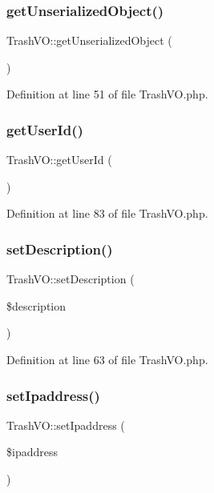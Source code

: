 \subsubsection{\texorpdfstring{get\+Unserialized\+Object()}{getUnserializedObject()}}
{\footnotesize\ttfamily Trash\+V\+O\+::get\+Unserialized\+Object (\begin{DoxyParamCaption}{ }\end{DoxyParamCaption})}



Definition at line 51 of file Trash\+V\+O.\+php.

\mbox{\label{classTrashVO_a2e999529c316982b83362d5e3af98675}} 
\subsubsection{\texorpdfstring{get\+User\+Id()}{getUserId()}}
{\footnotesize\ttfamily Trash\+V\+O\+::get\+User\+Id (\begin{DoxyParamCaption}{ }\end{DoxyParamCaption})}



Definition at line 83 of file Trash\+V\+O.\+php.

\mbox{\label{classTrashVO_a4a906fbc1092ca145e78355deb731c8e}} 
\subsubsection{\texorpdfstring{set\+Description()}{setDescription()}}
{\footnotesize\ttfamily Trash\+V\+O\+::set\+Description (\begin{DoxyParamCaption}\item[{}]{\$description }\end{DoxyParamCaption})}



Definition at line 63 of file Trash\+V\+O.\+php.

\mbox{\label{classTrashVO_ae5493240d6a9fc0615bec61fd1aed5a6}} 
\subsubsection{\texorpdfstring{set\+Ipaddress()}{setIpaddress()}}
{\footnotesize\ttfamily Trash\+V\+O\+::set\+Ipaddress (\begin{DoxyParamCaption}\item[{}]{\$ipaddress }\end{DoxyParamCaption})}



